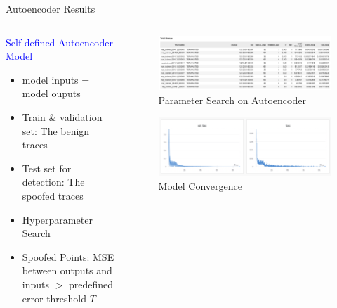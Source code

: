 \documentclass[aspectratio=169, 8pt]{beamer}
\begin{document}
\begin{frame}{Autoencoder Results}


\begin{columns}

\begin{column}{0.4 \linewidth}
    {\large \textcolor{blue}{Self-defined Autoencoder Model}}
    \begin{itemize}
        \item model inputs = model ouputs
        \item Train \& validation set: The benign traces
        \item Test set for detection: The spoofed traces
        \item Hyperparameter Search
        \item Spoofed Points: MSE between outputs and inputs \(>\) predefined error threshold \(T\)
    \end{itemize}
\end{column}


\begin{column}{0.7 \linewidth}
\begin{figure}
    \centering
    \includegraphics[width = 0.7 \linewidth]{images/ae-param-tune.png}
    \caption{Parameter Search on Autoencoder}
    \label{fig:enter-label}
\end{figure}
\begin{figure}
    \centering
    \includegraphics[width = 0.6 \linewidth]{images/ae_converge_new.png}
    \caption{Model Convergence}
    \label{fig:enter-label}
\end{figure}


\end{column}

\end{columns}

    
\end{frame}
\end{document}
